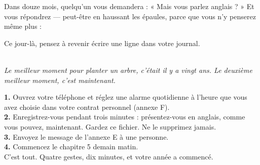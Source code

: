 Dans douze mois, quelqu'un vous demandera : « Mais vous parlez anglais ? » Et vous répondrez
--- peut-être en haussant les épaules, parce que vous n'y penserez même plus :

Ce jour-là, pensez à revenir écrire une ligne dans votre journal.

\begin{center}
\vspace{0.6cm}
\textit{}\\[6pt]
\footnotesize{}\textit{Le meilleur moment pour planter un arbre,
c'était il y a vingt ans. Le deuxième meilleur moment, c'est maintenant.}
\vspace{0.6cm}
\end{center}

\begin{mission}
\textbf{1.} Ouvrez votre téléphone et réglez une alarme quotidienne à l'heure que vous avez
choisie dans votre contrat personnel (annexe F).\\
\textbf{2.} Enregistrez-vous pendant trois minutes : présentez-vous en anglais, comme vous
pouvez, maintenant. Gardez ce fichier. Ne le supprimez jamais.\\
\textbf{3.} Envoyez le message de l'annexe E à une personne.\\
\textbf{4.} Commencez le chapitre 5 demain matin.\\
C'est tout. Quatre gestes, dix minutes, et votre année a commencé.
\end{mission}
